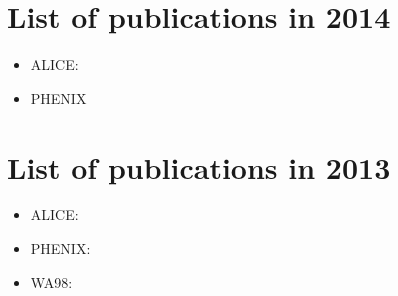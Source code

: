 \documentclass[12pt]{article}
\begin{document}
\section{List of publications in 2014}

\begin{itemize}
\item ALICE:
\cite{
Abelev:2014ckr,
Abelevetal:2014dna,
Abelevetal:2014cna,
TheALICE:2014dwa,
Abelev:2014mda,
Abelev:2014nua,
Abelev:2014hla,
Abelev:2014zpa,
Abelev:2014ypa,
Abelev:2014hha,
Abelev:2014dsa,
Abelev:2014ipa,
Abelev:2014epa,
Abelev:2014pja,
Abelev:2014qha,
Abelev:2014ffa,
Abelev:2014laa,
Abelev:2013kqa,
Abelev:2013ila,
Abelev:2013pqa,
Abelev:2013yxa,
Abelev:2013haa,
ABELEV:2013zaa}


\item PHENIX
\cite{
Adare:2014qzo,
Adare:2014mgt,
Adare:2014eyu,
Adare:2014vri,
Aidala:2014bqx,
Adare:2014hsq,
Adare:2014vax,
Adler:2013aqf,
Adare:2013ekj,
Adare:2013xlp,
Adare:2013yxp,
Adare:2013nff,
Adare:2013lkk}


\end{itemize}


\section{List of publications in 2013}

\begin{itemize}
\item ALICE:
\cite{
Abelev:2012sq,
ALICE:2012xs,
Abelev:2012sea,
Abelev:2012sca,
Abelev:2012pv,
Abelev:2012pa,
Abelev:2012di,
Abelev:2013xaa,
ABELEV:2013wsa,
Abelev:2013sqa,
Abelev:2013bla,
Abelev:2013ala,
Abelev:2013cva,
Abbas:2013taa,
Abelev:2013lca,
Abbas:2013rua,
Abbas:2013oua,
Abbas:2013bpa,
ALICE:2013xna,
Abelev:2013vea,
Abelev:2013qoq,
Abelev:2013csa,
Abelev:2013fn,
Abelev:2012ola,
ALICE:2012mj,
Abelev:2012ba,
Abelev:2012hxa}

\item PHENIX:
\cite{
Adare:2012bv,
Adare:2012vv,
Adare:2013wop,
Adare:2013ezl,
Adare:2013esx,
Adare:2013piz,
Adare:2012qi,
Adare:2012vw,
Adare:2012wg,
Adare:2012qf}


\item WA98:
\cite{Aggarwal:2011ns}

\end{itemize}

\end{document}

